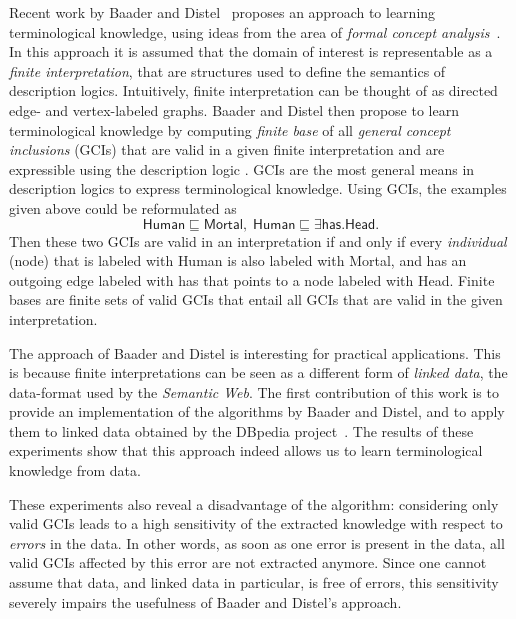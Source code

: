 \documentclass[english,fleqn]{scrartcl}
\begin{document}
Recent work by Baader and Distel~\cite{Diss-Felix} proposes an approach to learning
terminological knowledge, using ideas from the area of \emph{formal concept
  analysis}~\cite{fca-book}.  In this approach it is assumed that the domain of interest
is representable as a \emph{finite interpretation}, that are structures used to define the
semantics of description logics.  Intuitively, finite interpretation can be thought of as
directed edge- and vertex-labeled graphs.  Baader and Distel then propose to learn
terminological knowledge by computing \emph{finite base} of all \emph{general concept
  inclusions} (GCIs) that are valid in a given finite interpretation and are expressible
using the description logic \ELbot.  GCIs are the most general means in description logics
to express terminological knowledge.  Using GCIs, the examples given above could be
reformulated as
\begin{equation*}
  \mathsf{Human} \sqsubseteq \mathsf{Mortal}, \; \mathsf{Human} \sqsubseteq \exists
  \mathsf{has}. \mathsf{Head}.
\end{equation*}
Then these two GCIs are valid in an interpretation if and only if every \emph{individual}
(node) that is labeled with \textsf{Human} is also labeled with \textsf{Mortal}, and has
an outgoing edge labeled with \textsf{has} that points to a node labeled with
\textsf{Head}.  Finite bases are finite sets of valid GCIs that entail all GCIs that are
valid in the given interpretation.

The approach of Baader and Distel is interesting for practical applications.  This is
because finite interpretations can be seen as a different form of \emph{linked data}, the
data-format used by the \emph{Semantic Web}.  The first contribution of this work is to
provide an implementation of the algorithms by Baader and Distel, and to apply them to
linked data obtained by the DBpedia project~\cite{DBpedia}.  The results of these
experiments show that this approach indeed allows us to learn terminological knowledge
from data.

These experiments also reveal a disadvantage of the algorithm: considering only valid GCIs
leads to a high sensitivity of the extracted knowledge with respect to \emph{errors} in
the data.  In other words, as soon as one error is present in the data, all valid GCIs
affected by this error are not extracted anymore.  Since one cannot assume that data, and
linked data in particular, is free of errors, this sensitivity severely impairs the
usefulness of Baader and Distel's approach.
\end{document}
